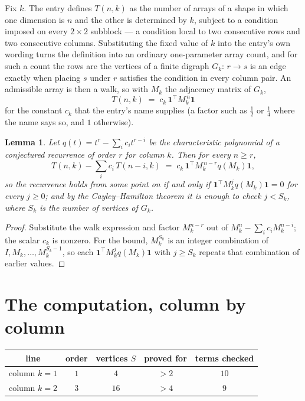 \documentclass[11pt,a4paper]{article}
\theoremstyle{plain}
\newtheorem{lemma}[theorem]{Lemma}
\theoremstyle{definition}
\begin{document}
Fix $k$. The entry defines $T(n,k)$ as the number of arrays of a shape in which one dimension
is $n$ and the other is determined by $k$, subject to a condition imposed on every
$2\times2$ subblock --- a condition local to two consecutive rows and two consecutive columns.
Substituting the fixed value of $k$ into the entry's own wording turns the definition into an
ordinary one-parameter array count, and for such a count the rows are the vertices of a finite
digraph $G_k$: $r\to s$ is an edge exactly when placing $s$ under $r$ satisfies the condition
in every column pair. An admissible array is then a walk, so with $M_k$ the adjacency matrix
of $G_k$,
\[
T(n,k)\;=\;c_k\,\mathbf{1}^{\!\top}M_k^{\,n}\mathbf{1}
\]
for the constant $c_k$ that the entry's name supplies (a factor such as $\tfrac12$ or
$\tfrac14$ where the name says so, and $1$ otherwise).

\begin{lemma}\label{lem:crit}
Let $q(t)=t^{r}-\sum_i c_it^{r-i}$ be the characteristic polynomial of a conjectured
recurrence of order $r$ for column $k$. Then for every $n\ge r$,
\[
T(n,k)-\sum_i c_i\,T(n-i,k)\;=\;c_k\,\mathbf{1}^{\!\top}M_k^{\,n-r}q(M_k)\mathbf{1},
\]
so the recurrence holds from some point on if and only if
$\mathbf{1}^{\!\top}M_k^{j}q(M_k)\mathbf{1}=0$ for every $j\ge0$; and by the
Cayley--Hamilton theorem it is enough to check $j<S_k$, where $S_k$ is the number of vertices
of $G_k$.
\end{lemma}

\begin{proof}
Substitute the walk expression and factor $M_k^{n-r}$ out of $M_k^{n}-\sum_ic_iM_k^{n-i}$;
the scalar $c_k$ is nonzero. For the bound, $M_k^{S_k}$ is an integer combination of
$I,M_k,\dots,M_k^{S_k-1}$, so each $\mathbf{1}^{\!\top}M_k^{j}q(M_k)\mathbf{1}$ with
$j\ge S_k$ repeats that combination of earlier values.
\end{proof}

\section{The computation, column by column}

\begin{center}
\begin{tabular}{ccccc}
line & order & vertices $S$ & proved for & terms checked \\ \hline
column $k$$=1$ & $1$ & $4$ & $>2$ & $10$ \\
column $k$$=2$ & $3$ & $16$ & $>4$ & $9$ \\
\end{tabular}
\end{center}
\end{document}

